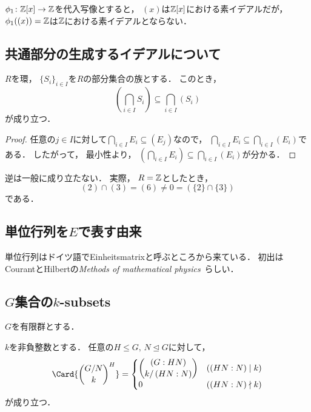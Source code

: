 \documentclass{jlreq}
\newcommand{\GeneratedIdealBy}[1]{\left(#1\right)}
\newcommand{\FixedPts}[2]{{#1}^{#2}}
\newcommand{\Index}[2]{\left(#2 : #1\right)}
\begin{document}
	$\phi_1 \colon \mathbb{Z}[x] \to \mathbb{Z}$を代入写像とすると，
	$(x)$は$\mathbb{Z}[x]$における素イデアルだが，
	$\phi_1((x)) = \mathbb{Z}$は$\mathbb{Z}$における素イデアルとならない．
	
	\subsection{共通部分の生成するイデアルについて}
	
	\begin{proposition}
		$R$を環，
		$\{S_i\}_{i \in I}$を$R$の部分集合の族とする．
		このとき，
		\begin{equation}
			\GeneratedIdealBy{\bigcap_{i \in I} S_i} \subseteq \bigcap_{i \in I} \GeneratedIdealBy{S_i}
		\end{equation}
		が成り立つ．
	\end{proposition}
	
	\begin{proof}
		任意の$j \in I$に対して$\bigcap_{i \in I} E_i \subseteq \GeneratedIdealBy{E_j}$なので，
		$\bigcap_{i \in I} E_i \subseteq \bigcap_{i \in I} \GeneratedIdealBy{E_i}$である．
		したがって，
		最小性より，
		$\GeneratedIdealBy{\bigcap_{i \in I} E_i} \subseteq \bigcap_{i \in I} \GeneratedIdealBy{E_i}$が分かる．
	\end{proof}
	
	逆は一般に成り立たない．
	実際，
	$R = \mathbb{Z}$としたとき，
	\begin{equation}
		\GeneratedIdealBy{2} \cap \GeneratedIdealBy{3}
		= \GeneratedIdealBy{6} \ne 0
		= \GeneratedIdealBy{\{2\} \cap \{3\}}
	\end{equation}
	である．
	
	\subsection{単位行列を\texorpdfstring{$E$}{E}で表す由来}
	
	単位行列はドイツ語でEinheitsmatrixと呼ぶところから来ている．
	初出はCourantとHilbertの\textit{Methods of mathematical physics}~\cite{courant1953}らしい．
	
	\subsection{\texorpdfstring{$G$集合の$k$-subsets}{G集合のk-subsets}}
	
	$G$を有限群とする．
	
	\begin{proposition}\label{prop:k-subsets_fixed_pts}
		$k$を非負整数とする．
		任意の$H \le G,\, N \trianglelefteq G$に対して，
		\begin{equation}
			\Card{\FixedPts{\binom{G/N}{k}}{H}}
			= \begin{cases}
				\dbinom{\Index{HN}{G}}{k/\Index{N}{HN}} & (\Index{N}{HN} \mid k) \\
				0 & (\Index{N}{HN} \nmid k)
			\end{cases}
		\end{equation}
		が成り立つ．
	\end{proposition}
	
\end{document}

